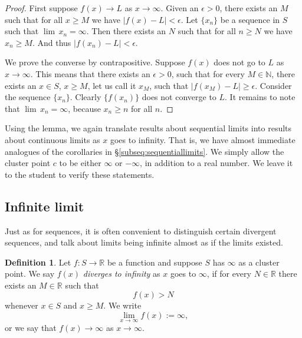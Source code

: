 \documentclass[12pt]{book}
\newcommand{\abs}[1]{\left\lvert {#1} \right\rvert}
\newcommand{\R}{{\mathbb{R}}}
\newcommand{\N}{{\mathbb{N}}}
\newcommand{\myindex}[1]{#1\index{#1}}
\theoremstyle{plain}
\theoremstyle{remark}
\theoremstyle{definition}
\newtheorem{defn}[thm]{Definition}
\theoremstyle{exercise}
\theoremstyle{example}
\newcommand{\sectionref}[1]{\hyperref[#1]{\S\ref*{#1}}}
\begin{document}
\begin{proof}
First suppose $f(x) \to L$ as $x \to \infty$.
Given an $\epsilon > 0$, there exists an $M$ such that for all $x \geq M$
we have $\abs{f(x)-L} < \epsilon$.
Let $\{ x_n \}$
be a sequence in $S$ such that $\lim \, x_n = \infty$.  Then there exists an
$N$ such that for all $n \geq N$ we have $x_n \geq M$.  And thus
$\abs{f(x_n)-L} < \epsilon$.

We prove the converse by contrapositive.  Suppose $f(x)$ does
not go to $L$ as $x \to \infty$.
This means that there exists an $\epsilon > 0$,
such that for every $M \in \N$, there exists an $x \in S$, $x \geq M$, let
us call it $x_M$, such that $\abs{f(x_M)-L} \geq \epsilon$.
Consider the sequence $\{ x_n \}$.  Clearly 
$\{ f(x_n) \}$ does not converge to $L$.  It remains to note
that $\lim\, x_n = \infty$, because $x_n \geq n$ for all $n$.
\end{proof}

Using the lemma, we again translate results about sequential
limits into results about continuous limits as $x$ goes to infinity.  That
is, we have almost immediate analogues of the corollaries
in \sectionref{subseq:sequentiallimits}.  We simply allow 
the cluster point $c$ to be either $\infty$ or $-\infty$, in addition
to a real number.  We leave it to
the student to verify these statements.

\subsection{Infinite limit}

Just as for sequences, it is often convenient to distinguish certain
divergent sequences, and talk about limits being infinite
almost as if the limits existed.

\begin{defn}
%
Let $f \colon S \to \R$ be a function and suppose 
$S$ has $\infty$ as a cluster point.
We say $f(x)$
\emph{\myindex{diverges to infinity}} 
as $x$ goes to $\infty$,
if for every $N \in \R$
there exists an $M \in \R$ such that
\begin{equation*}
f(x) > N
\end{equation*}
whenever $x \in S$ and $x \geq M$.
We write
\begin{equation*}
\lim_{x \to \infty} f(x) := \infty ,
\end{equation*}
or we say that $f(x) \to \infty$ as $x \to \infty$.
\end{defn}
\end{document}
